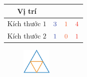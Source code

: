 \begin{multicols}{2}
	\begin{table}[H]
		\setlength{\tabcolsep}{2pt}
		\renewcommand{\arraystretch}{1.3}
		\begin{tabular}{|c|c|c|c|}
			\hline
			Vị trí & {\color{timhieukhoahoc}{Lên}}  & {\color{duongvaotoanhoc}{Xuống}} & {\color{toanhocdoisong}{Tổng}}\\
			\hline
			Kích thước $1$ & ${\color{timhieukhoahoc}{3}}$ &${\color{duongvaotoanhoc}{1}}$ & ${\color{toanhocdoisong}{4}}$\\
			\hline
			Kích thước $2$ & ${\color{timhieukhoahoc}{1}}$ & ${\color{duongvaotoanhoc}{0}}$ & ${\color{toanhocdoisong}{1}}$ \\
			\hline
		\end{tabular}
	\end{table}
	\begin{figure}[H]
		\vspace*{-5pt}
		\centering
		\captionsetup{labelformat= empty, justification=centering}
		\includegraphics[width=0.125\textwidth]{Hinh23_1}
		\caption{}
		\vspace*{-5pt}
	\end{figure}
\end{multicols}
